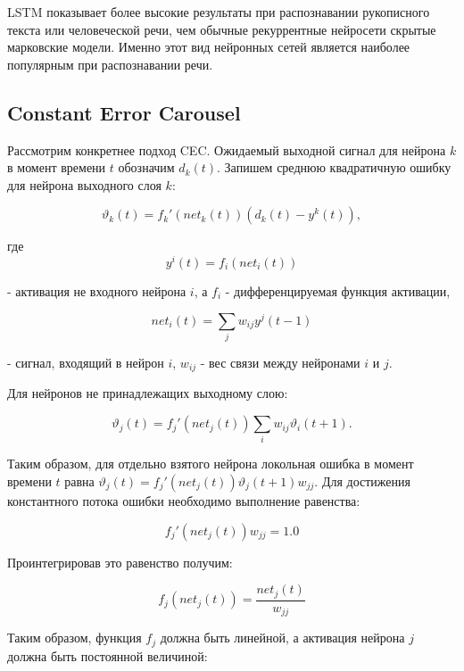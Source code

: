 \documentclass[14pt]{article}
\begin{document}
LSTM показывает более высокие результаты при распознавании рукописного текста или человеческой речи, чем обычные рекуррентные нейросети скрытые марковские модели. Именно этот вид нейронных сетей является наиболее популярным при распознавании речи.

\subsection{Constant Error Carousel}
Рассмотрим конкретнее подход CEC. Ожидаемый выходной сигнал для нейрона $k$ в момент времени $t$ обозначим $d_k(t)$. Запишем среднюю квадратичную ошибку для нейрона выходного слоя $k$:

\begin{equation}
\vartheta_k(t) = f_k'(net_k(t))(d_k(t) - y^k(t)),
\end{equation}


где
\begin{equation}
y^i(t) = f_i(net_i(t))
\end{equation}

- активация не входного нейрона $i$, а $f_i$ - дифференцируемая функция активации,


\begin{equation}
net_i(t) = \sum\limits_jw_{ij}y^j(t - 1)
\end{equation}

- сигнал, входящий в нейрон $i$, $w_{ij}$ - вес связи между нейронами $i$ и $j$.


Для нейронов не принадлежащих выходному слою:


\begin{equation}
\vartheta_j(t) = f_j'(net_j(t))\sum\limits_iw_{ij}\vartheta_i(t + 1).
\end{equation}


Таким образом, для отдельно взятого нейрона локольная ошибка в момент времени $t$ равна $\vartheta_j(t) = f_j'(net_j(t))\vartheta_j(t + 1)w_{jj}$. Для достижения константного потока ошибки необходимо выполнение равенства:

\begin{equation}
f_j'(net_j(t))w_{jj} = 1.0
\end{equation}


Проинтегрировав это равенство получим:

\begin{equation}
f_j(net_j(t)) = \frac{net_j(t)}{w_{jj}}
\end{equation}

Таким образом, функция $f_j$ должна быть линейной, а активация нейрона $j$ должна быть постоянной величиной:
\end{document}
